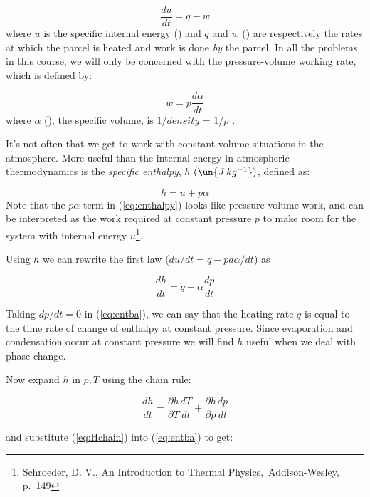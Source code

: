 \documentclass[12pt]{article}
\begin{document}
\begin{equation}
  \label{eq:firstwh}
  \frac{du}{dt} = q - w
\end{equation}
where $u$ is the specific internal energy (\jkg) and $q$ and $w$ (\jkgs) are respectively the
rates at which the parcel is heated and work is done \textit{by} the parcel.
In all the problems in this course, we will only be concerned with the pressure-volume
working rate, which is defined by:

\begin{equation}
  \label{eq:pvwork}
  w = p \frac{d \alpha}{dt}
\end{equation}
where $\alpha$  (\volkg), the specific volume, is $1/density$ = $1/\rho$ .

It's not often that we get to work with constant volume situations in
the atmosphere.  More useful than the internal energy in atmospheric
thermodynamics is the \textit{specific enthalpy}, $h\ 
(\un{J\,kg^{-1}})$, defined as:

\begin{equation}
  \label{eq:enthalpy}
  h  = u + p\alpha
\end{equation}
Note that the $p \alpha$ term in (\ref{eq:enthalpy}) looks like pressure-volume
work, and can be interpreted as the work required at constant pressure $p$
to make room for the system with internal energy $u$\footnote{Schroeder, D. V., An Introduction
to Thermal Physics,\ Addison-Wesley, p.~149}.

Using $h$ we can rewrite the first law ($du/dt = q - p d\alpha/dt$) as

\begin{equation}
  \label{eq:entba}
  \frac{dh}{dt} = q   + \alpha \frac{dp}{dt}
\end{equation}

Taking $dp/dt=0$ in (\ref{eq:entba}), we can say that the heating rate
$q$ is equal to the time rate of change of enthalpy at constant
pressure.  Since evaporation and condensation occur at constant
pressure we will find $h$ useful when we deal with phase change.

Now expand $h$ in $p,T$ using the chain rule:

\begin{equation}
  \label{eq:Hchain}
  \frac{dh}{dt} = \frac{\partial h}{\partial T} \frac{dT}{dt} + 
                  \frac{\partial h}{\partial p} \frac{dp}{dt}
\end{equation}

and substitute (\ref{eq:Hchain}) into (\ref{eq:entba}) to get:
\end{document}
